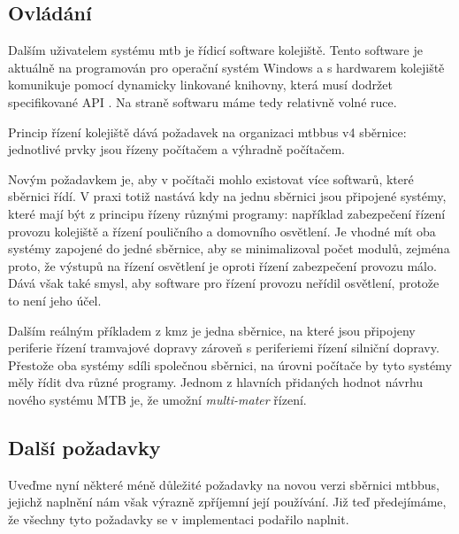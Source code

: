 \subsection{Ovládání}

Dalším uživatelem systému \gls{mtb} je řídicí software kolejiště. Tento
software je aktuálně na programován pro operační systém Windows a s hardwarem
kolejiště komunikuje pomocí dynamicky linkované knihovny, která musí dodržet
specifikované API \cite{api}. Na straně softwaru máme tedy relativně volné
ruce.

Princip řízení kolejiště dává požadavek na organizaci \gls{mtbbus} v4 sběrnice:
jednotlivé prvky jsou řízeny počítačem a výhradně počítačem.

Novým požadavkem je, aby v počítači mohlo existovat více softwarů, které
sběrnici řídí. V praxi totiž nastává kdy na jednu sběrnici jsou připojené systémy,
které mají být z principu řízeny různými programy: například zabezpečení řízení
provozu kolejiště a řízení pouličního a domovního osvětlení. Je vhodné mít oba
systémy zapojené do jedné sběrnice, aby se minimalizoval počet modulů, zejména
proto, že výstupů na řízení osvětlení je oproti řízení zabezpečení provozu málo.
Dává však také smysl, aby software pro řízení provozu neřídil osvětlení, protože
to není jeho účel.

Dalším reálným příkladem z \gls{kmz} je jedna sběrnice, na které jsou připojeny
periferie řízení tramvajové dopravy zároveň s periferiemi řízení silniční
dopravy. Přestože oba systémy sdíli společnou sběrnici, na úrovni počítače by
tyto systémy měly řídit dva různé programy. Jednom z hlavních přidaných hodnot
návrhu nového systému MTB je, že umožní \textit{multi-mater} řízení.

\subsection{Další požadavky}

Uveďme nyní některé méně důležité požadavky na novou verzi sběrnici \gls{mtbbus},
jejichž naplnění nám však výrazně zpříjemní její používání. Již teď předejímáme,
že všechny tyto požadavky se v implementaci podařilo naplnit.

